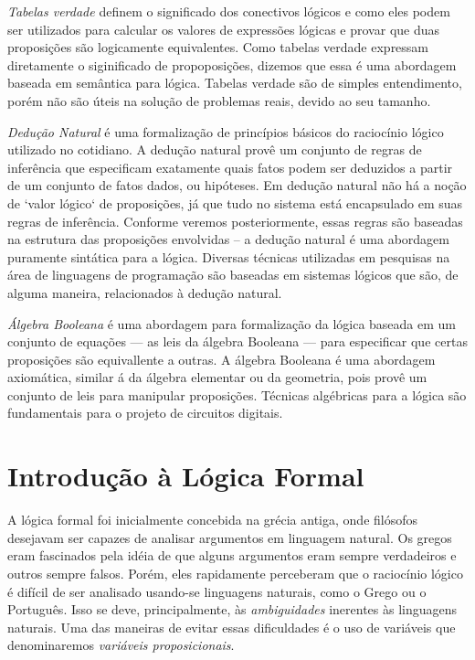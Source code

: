 \emph{Tabelas verdade} definem o significado dos conectivos l\'ogicos e como eles podem ser utilizados para calcular os
valores de express\~oes lógicas e provar que duas proposi\c{c}\~oes s\~ao logicamente equivalentes. Como tabelas verdade
expressam diretamente o siginificado de propoposi\c{c}\~oes, dizemos que essa é uma abordagem baseada em sem\^antica para l\'ogica.
Tabelas verdade s\~ao de simples entendimento, por\'em n\~ao s\~ao \'uteis na solu\c{c}\~ao de problemas reais, devido ao seu tamanho.

\emph{Dedu\c{c}\~ao Natural} \'e uma formaliza\c{c}\~ao de princ\'ipios b\'asicos do racioc\'inio l\'ogico utilizado no cotidiano.
A dedu\c{c}\~ao natural prov\^e um conjunto de regras de infer\^encia que especificam exatamente quais fatos podem ser deduzidos
a partir de um conjunto de fatos dados, ou hipóteses. Em dedu\c{c}\~ao natural n\~ao h\'a a no\c{c}\~ao de `valor l\'ogico` de proposi\c{c}\~oes,
j\'a que tudo no sistema est\'a encapsulado em suas regras de infer\^encia. Conforme veremos posteriormente, essas regras s\~ao baseadas
na estrutura das proposi\c{c}\~oes envolvidas -- a dedu\c{c}\~ao natural \'e uma abordagem puramente sint\'atica para a l\'ogica. Diversas
t\'ecnicas utilizadas em pesquisas na \'area de linguagens de programa\c{c}\~ao s\~ao baseadas em sistemas l\'ogicos que s\~ao, de alguma maneira, relacionados \`a dedu\c{c}\~ao natural.

\emph{\'Algebra Booleana} \'e uma abordagem para formaliza\c{c}\~ao da l\'ogica baseada em um conjunto de equa\c{c}\~oes --- as leis
da \'algebra Booleana --- para especificar que certas proposi\c{c}\~oes s\~ao equivallente a outras. A \'algebra Booleana \'e uma abordagem
axiom\'atica, similar \'a da \'algebra elementar ou da geometria, pois prov\^e um conjunto de leis para manipular proposi\c{c}\~oes. T\'ecnicas
alg\'ebricas para a l\'ogica s\~ao fundamentais para o projeto de circuitos digitais.

\section{Introdu\c{c}\~ao \`a L\'ogica Formal}\label{cap1:sec1}

A l\'ogica formal foi inicialmente concebida na gr\'ecia antiga, onde fil\'osofos desejavam ser capazes de analisar argumentos
em linguagem natural. Os gregos eram fascinados pela id\'eia de que alguns argumentos eram sempre verdadeiros e outros sempre
falsos. Por\'em, eles rapidamente perceberam que o racioc\'inio l\'ogico \'e dif\'icil de ser analisado usando-se linguagens naturais,
como o Grego ou o Portugu\^es. Isso se deve, principalmente, \`as \emph{ambiguidades} inerentes \`as linguagens naturais.
Uma das maneiras de evitar essas dificuldades \'e o uso de vari\'aveis que denominaremos \emph{vari\'aveis proposicionais}.

